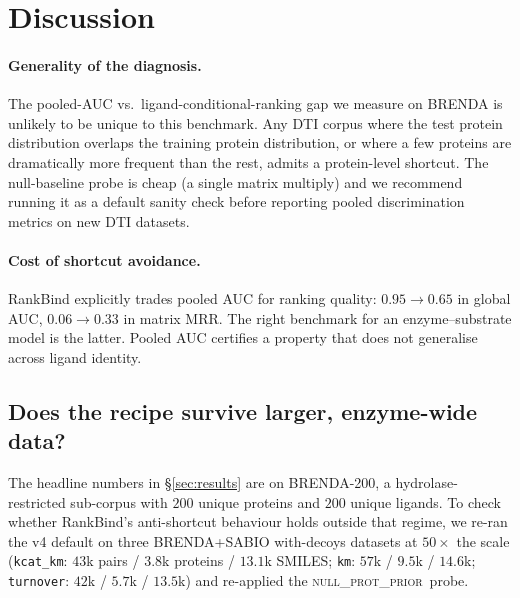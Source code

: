 \documentclass[11pt,a4paper]{article}
\newcommand{\method}{RankBind\xspace}
\newcommand{\nullprior}{\textsc{null\_prot\_prior}\xspace}
\newcommand{\gauc}{global AUC}
\newcommand{\matmrr}{matrix MRR}
\begin{document}
\section{Discussion}
\label{sec:discussion}

\paragraph{Generality of the diagnosis.}
The pooled-AUC vs.\ ligand-conditional-ranking gap we measure on
BRENDA is unlikely to be unique to this benchmark. Any DTI corpus
where the test protein distribution overlaps the training protein
distribution, or where a few proteins are dramatically more frequent
than the rest, admits a protein-level shortcut. The null-baseline
probe is cheap (a single matrix multiply) and we recommend running it
as a default sanity check before reporting pooled discrimination
metrics on new DTI datasets.

\paragraph{Cost of shortcut avoidance.}
\method explicitly trades pooled AUC for ranking quality: $0.95 \to
0.65$ in \gauc, $0.06 \to 0.33$ in \matmrr. The right benchmark for
an enzyme--substrate model is the latter. Pooled AUC certifies a
property that does not generalise across ligand identity.

\subsection{Does the recipe survive larger, enzyme-wide data?}
\label{sec:transfer}

The headline numbers in \S\ref{sec:results} are on BRENDA-200, a
hydrolase-restricted sub-corpus with $200$ unique proteins and $200$
unique ligands. To check whether \method's anti-shortcut behaviour
holds outside that regime, we re-ran the v4 default on three
BRENDA+SABIO with-decoys datasets at $50\times$ the scale
(\texttt{kcat\_km}: $43$k pairs / $3.8$k proteins / $13.1$k SMILES;
\texttt{km}: $57$k / $9.5$k / $14.6$k; \texttt{turnover}: $42$k /
$5.7$k / $13.5$k) and re-applied the \nullprior\ probe.
\end{document}
